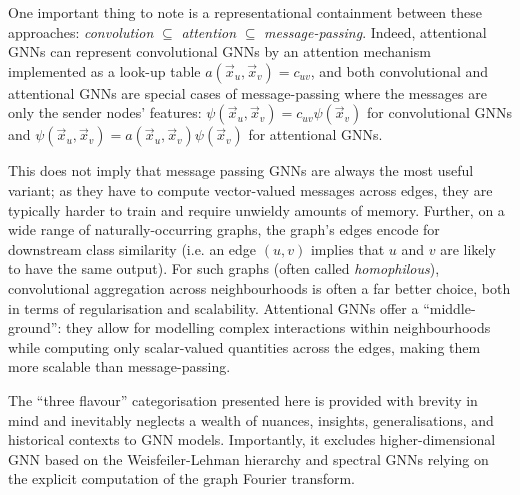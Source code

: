 One important thing to note is a representational containment between these approaches: \emph{convolution} $\subseteq$ \emph{attention} $\subseteq$ \emph{message-passing}. Indeed, attentional GNNs can represent convolutional GNNs by an attention mechanism implemented as a look-up table $a(\vec{x}_u, \vec{x}_v) = c_{uv}$, and both convolutional and attentional GNNs are special cases of message-passing where the messages are only the sender nodes' features: $\psi(\vec{x}_u, \vec{x}_v) = c_{uv}\psi(\vec{x}_v)$ for convolutional GNNs and $\psi(\vec{x}_u, \vec{x}_v) = a(\vec{x}_u, \vec{x}_v)\psi(\vec{x}_v)$ for attentional GNNs.
%

This does not imply that message passing GNNs are always the most useful variant; as they have to compute vector-valued messages across edges, they are typically harder to train and require unwieldy amounts of memory. Further, on a wide range of naturally-occurring graphs, the graph's edges encode for downstream class similarity (i.e. an edge $(u, v)$ implies that $u$ and $v$ are likely to have the same output). For such graphs (often called \emph{homophilous}), convolutional aggregation across neighbourhoods is often a far better choice, both in terms of regularisation and scalability. Attentional GNNs offer a ``middle-ground'': they allow for modelling complex interactions within neighbourhoods while computing only scalar-valued quantities across the edges, making them more scalable than message-passing.


The ``three flavour'' categorisation presented here is provided with brevity in mind and inevitably neglects a wealth of nuances, insights, generalisations, and historical contexts to GNN models. Importantly, it excludes higher-dimensional GNN based on the Weisfeiler-Lehman hierarchy and spectral %
GNNs relying on the explicit computation of the graph Fourier transform. 
%

